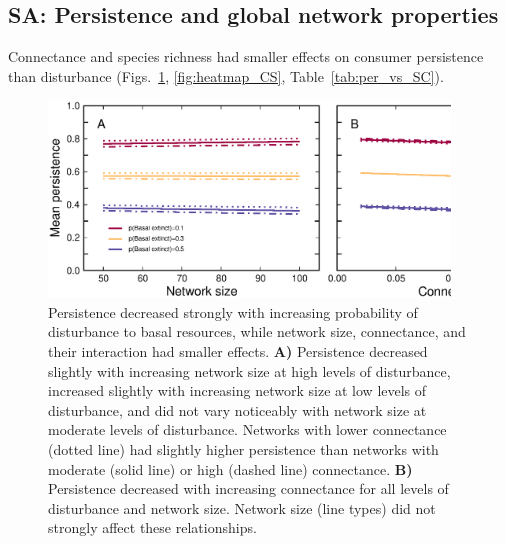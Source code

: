 \documentclass[12pt]{article}
\begin{document}
\begin{spacing}{2.0}

    

\section{SA: Persistence and global network properties}

    Connectance and species richness had smaller effects on consumer persistence than disturbance (Figs.~\ref{fig:lm_CS}, \ref{fig:heatmap_CS}, Table~\ref{tab:per_vs_SC}).


    \begin{figure}[h!]
        \centering
        \includegraphics[width=0.95\textwidth]{figures/persistence_vs_SC_lm.eps}
        \caption{Persistence decreased strongly with increasing probability of disturbance to basal resources, while network size, connectance, and their interaction had smaller effects. \textbf{A)} Persistence decreased slightly with increasing network size at high levels of disturbance, increased slightly with increasing network size at low levels of disturbance, and did not vary noticeably with network size at moderate levels of disturbance. Networks with lower connectance (dotted line) had slightly higher persistence than networks with moderate (solid line) or high (dashed line) connectance.
        \textbf{B)} Persistence decreased with increasing connectance for all levels of disturbance and network size. Network size (line types) did not strongly affect these relationships.}
        \label{fig:lm_CS}
    \end{figure}




\end{spacing}
\end{document}
